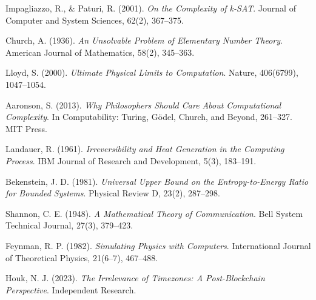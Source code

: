 \documentclass[12pt]{report}
\begin{document}
\begin{thebibliography}{9}
Impagliazzo, R., \& Paturi, R. (2001). \textit{On the Complexity of k-SAT}. Journal of Computer and System Sciences, 62(2), 367–375.

Church, A. (1936). \textit{An Unsolvable Problem of Elementary Number Theory}. American Journal of Mathematics, 58(2), 345–363.

Lloyd, S. (2000). \textit{Ultimate Physical Limits to Computation}. Nature, 406(6799), 1047–1054.

Aaronson, S. (2013). \textit{Why Philosophers Should Care About Computational Complexity}. In Computability: Turing, Gödel, Church, and Beyond, 261–327. MIT Press.

Landauer, R. (1961). \textit{Irreversibility and Heat Generation in the Computing Process}. IBM Journal of Research and Development, 5(3), 183–191.

Bekenstein, J. D. (1981). \textit{Universal Upper Bound on the Entropy-to-Energy Ratio for Bounded Systems}. Physical Review D, 23(2), 287–298.

Shannon, C. E. (1948). \textit{A Mathematical Theory of Communication}. Bell System Technical Journal, 27(3), 379–423.

Feynman, R. P. (1982). \textit{Simulating Physics with Computers}. International Journal of Theoretical Physics, 21(6–7), 467–488.

Houk, N. J. (2023). \textit{The Irrelevance of Timezones: A Post-Blockchain Perspective}. Independent Research.

\end{thebibliography}
\end{document}
